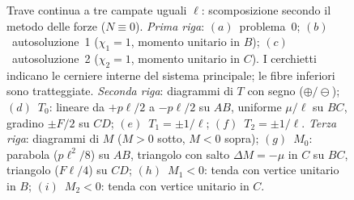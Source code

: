 \begin{figure}[htbp]
{
}%
\caption{Trave continua a tre campate uguali $\ell$: scomposizione secondo il
	metodo delle forze ($N\equiv 0$).
	\emph{Prima riga}: $(a)$~problema~$0$; $(b)$~autosoluzione~1 ($\chi_1=1$,
	momento unitario in $B$); $(c)$~autosoluzione~2 ($\chi_2=1$, momento unitario
	in $C$). I cerchietti indicano le cerniere interne del sistema principale;
	le fibre inferiori sono tratteggiate.
	\emph{Seconda riga}: diagrammi di $T$ con segno ($\oplus/\ominus$);
	$(d)$~$T_0$: lineare da $+p\ell/2$ a $-p\ell/2$ su $AB$, uniforme
	$\mu/\ell$ su $BC$, gradino $\pm F/2$ su $CD$; $(e)$~$T_1=\pm 1/\ell$;
	$(f)$~$T_2=\pm 1/\ell$.
	\emph{Terza riga}: diagrammi di $M$ ($M>0$ sotto, $M<0$ sopra);
	$(g)$~$M_0$: parabola ($p\ell^2/8$) su $AB$, triangolo con salto
	$\Delta M=-\mu$ in $C$ su $BC$, triangolo ($F\ell/4$) su $CD$;
	$(h)$~$M_1<0$: tenda con vertice unitario in $B$;
	$(i)$~$M_2<0$: tenda con vertice unitario in $C$.}
\label{fig:tc_scomposizione}
\end{figure}

